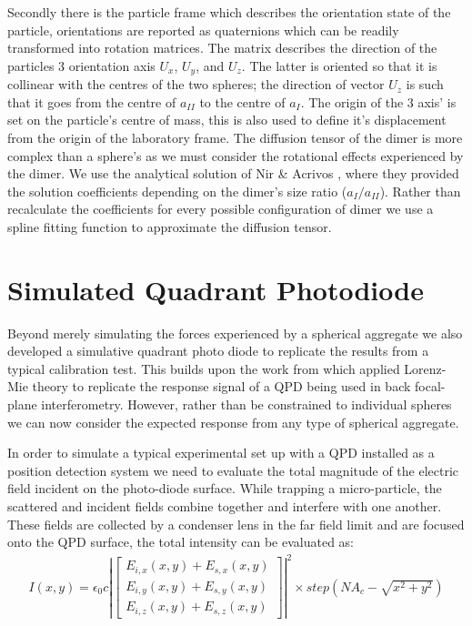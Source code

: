 Secondly there is the particle frame which describes the orientation state of 
the particle, orientations are reported as quaternions which can be readily 
transformed into rotation matrices. The matrix describes the direction of the 
particles 3 orientation axis $U_x$, $U_y$, and $U_z$. The latter is oriented 
so that it is collinear with the centres of the two spheres; the direction of
vector $U_z$ is such that it goes from the centre of $a_{II}$ to the centre of
$a_{I}$. The origin of the 3 axis' is set on the particle's centre of mass, 
this is also used to define it's displacement from the origin of the laboratory 
frame. The diffusion tensor of the dimer is more complex than a sphere's as we 
must consider the rotational effects experienced by the dimer. We use the 
analytical solution of Nir \& Acrivos \cite{Nir1973}, where they provided the 
solution coefficients depending on the dimer's size ratio ($a_I/a_{II}$). Rather 
than recalculate the coefficients for every possible configuration of dimer we 
use a spline fitting function to approximate the diffusion tensor. 
\section{Simulated Quadrant Photodiode}
\label{sec:simulated_QPD}

Beyond merely simulating the forces experienced by a spherical aggregate we
also developed a simulative quadrant photo diode to replicate the results
from a typical calibration test. This builds upon the work from \cite{Rohrbach2002} which applied Lorenz-Mie theory to replicate the response signal of a QPD 
being used in back focal-plane interferometry. However, rather than be 
constrained to individual spheres we can now consider the expected response 
from any type of spherical aggregate. 

In order to simulate a typical experimental set up with a QPD installed 
as a position detection system we need to evaluate the total magnitude of 
the electric field incident on the photo-diode surface. While trapping a 
micro-particle, the scattered and incident fields combine together and 
interfere with one another. These fields are collected by a condenser 
lens in the far field limit and are focused onto the QPD surface, the 
total intensity can be evaluated as:
\begin{align}
I(x,y) = \epsilon_0c\left|
\begin{bmatrix} 
	E_{i,x}(x,y)+E_{s,x}(x,y) \\ 
	E_{i,y}(x,y)+E_{s,y}(x,y) \\ 
	E_{i,z}(x,y)+E_{s,z}(x,y)
\end{bmatrix} \right|^2 \times step(NA_c-\sqrt{x^2+y^2})
\end{align}

